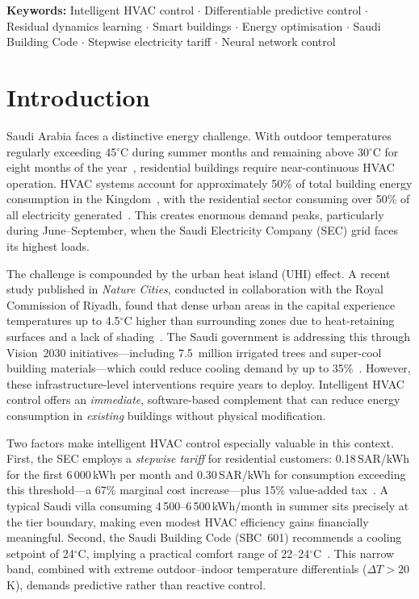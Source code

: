 \documentclass[12pt]{article}
\theoremstyle{plain}
\theoremstyle{definition}
\begin{document}
\smallskip\noindent\textbf{Keywords:} Intelligent HVAC control $\cdot$ Differentiable predictive control $\cdot$ Residual dynamics learning $\cdot$ Smart buildings $\cdot$ Energy optimisation $\cdot$ Saudi Building Code $\cdot$ Stepwise electricity tariff $\cdot$ Neural network control

\section{Introduction}\label{sec:intro}

Saudi Arabia faces a distinctive energy challenge. With outdoor temperatures regularly exceeding 45$^\circ$C during summer months and remaining above 30$^\circ$C for eight months of the year~\cite{weatheratlas2024}, residential buildings require near-continuous HVAC operation. HVAC systems account for approximately 50\% of total building energy consumption in the Kingdom~\cite{perez2008review}, with the residential sector consuming over 50\% of all electricity generated~\cite{sec2025}. This creates enormous demand peaks, particularly during June--September, when the Saudi Electricity Company (SEC) grid faces its highest loads.

The challenge is compounded by the urban heat island (UHI) effect. A recent study published in \emph{Nature Cities}, conducted in collaboration with the Royal Commission of Riyadh, found that dense urban areas in the capital experience temperatures up to 4.5$^\circ$C higher than surrounding zones due to heat-retaining surfaces and a lack of shading~\cite{santamouris2024riyadh}. The Saudi government is addressing this through Vision~2030 initiatives---including 7.5~million irrigated trees and super-cool building materials---which could reduce cooling demand by up to 35\%~\cite{urbansci2025}. However, these infrastructure-level interventions require years to deploy. Intelligent HVAC control offers an \emph{immediate}, software-based complement that can reduce energy consumption in \emph{existing} buildings without physical modification.

Two factors make intelligent HVAC control especially valuable in this context. First, the SEC employs a \emph{stepwise tariff} for residential customers: 0.18\,SAR/kWh for the first 6\,000\,kWh per month and 0.30\,SAR/kWh for consumption exceeding this threshold---a 67\% marginal cost increase---plus 15\% value-added tax~\cite{ecra2025}. A typical Saudi villa consuming 4\,500--6\,500\,kWh/month in summer sits precisely at the tier boundary, making even modest HVAC efficiency gains financially meaningful. Second, the Saudi Building Code (SBC~601) recommends a cooling setpoint of 24$^\circ$C, implying a practical comfort range of 22--24$^\circ$C~\cite{sbc601}. This narrow band, combined with extreme outdoor--indoor temperature differentials ($\Delta T > 20$K), demands predictive rather than reactive control.
\end{document}
